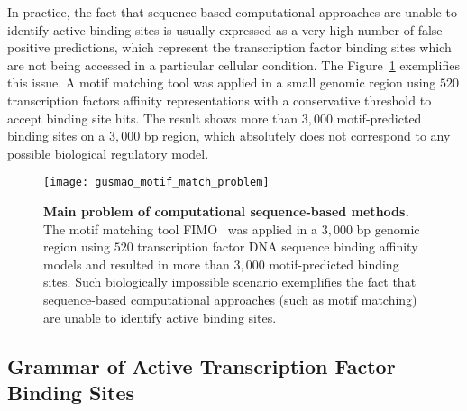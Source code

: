 In practice, the fact that sequence-based computational approaches are unable to identify active binding sites is usually expressed as a very high number of false positive predictions, which represent the transcription factor binding sites which are not being accessed in a particular cellular condition. The Figure~\ref{fig:gusmao_motif_match_problem} exemplifies this issue. A motif matching tool was applied in a small genomic region using $520$ transcription factors affinity representations with a conservative threshold to accept binding site hits. The result shows more than $3,000$ motif-predicted binding sites on a $3,000$ bp region, which absolutely does not correspond to any possible biological regulatory model.

\begin{figure}[h!]
\centering
\texttt{[image: gusmao\_motif\_match\_problem]}
\caption[Main problem of computational sequence-based methods]{\textbf{Main problem of computational sequence-based methods.} The motif matching tool FIMO~\cite{grant2011} was applied in a $3,000$ bp genomic region using $520$ transcription factor DNA sequence binding affinity models and resulted in more than $3,000$ motif-predicted binding sites. Such biologically impossible scenario exemplifies the fact that sequence-based computational approaches (such as motif matching) are unable to identify active binding sites.}
\label{fig:gusmao_motif_match_problem}
\end{figure}

\subsection{Grammar of Active Transcription Factor Binding Sites}
\label{sec:grammar.tfbs}

